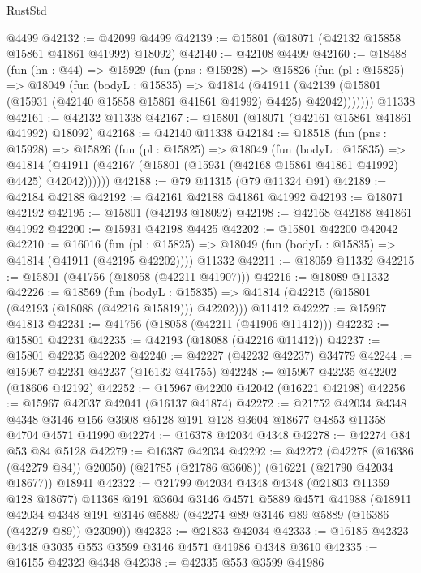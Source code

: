 \begin{lexlean}{RustStd}
\begin{coremodule}
    @4499
@42132 := @42099 @4499
@42139 := @15801 (@18071 (@42132 @15858 @15861 @41861 @41992) @18092)
@42140 := @42108 @4499
@42160 := @18488
    (fun (hn : @44) =>
    @15929
      (fun (pns : @15928) =>
      @15826
        (fun (pl : @15825) =>
        @18049
          (fun (bodyL : @15835) =>
          @41814
            (@41911
              (@42139 (@15801 (@15931 (@42140 @15858 @15861 @41861 @41992) @4425) @42042)))))))
    @11338
@42161 := @42132 @11338
@42167 := @15801 (@18071 (@42161 @15861 @41861 @41992) @18092)
@42168 := @42140 @11338
@42184 := @18518
    (fun (pns : @15928) =>
    @15826
      (fun (pl : @15825) =>
      @18049
        (fun (bodyL : @15835) =>
        @41814 (@41911 (@42167 (@15801 (@15931 (@42168 @15861 @41861 @41992) @4425) @42042))))))
@42188 := @79 @11315 (@79 @11324 @91)
@42189 := @42184 @42188
@42192 := @42161 @42188 @41861 @41992
@42193 := @18071 @42192
@42195 := @15801 (@42193 @18092)
@42198 := @42168 @42188 @41861 @41992
@42200 := @15931 @42198 @4425
@42202 := @15801 @42200 @42042
@42210 := @16016
    (fun (pl : @15825) => @18049 (fun (bodyL : @15835) => @41814 (@41911 (@42195 @42202))))
    @11332
@42211 := @18059 @11332
@42215 := @15801 (@41756 (@18058 (@42211 @41907)))
@42216 := @18089 @11332
@42226 := @18569
    (fun (bodyL : @15835) => @41814 (@42215 (@15801 (@42193 (@18088 (@42216 @15819))) @42202)))
    @11412
@42227 := @15967 @41813
@42231 := @41756 (@18058 (@42211 (@41906 @11412)))
@42232 := @15801 @42231
@42235 := @42193 (@18088 (@42216 @11412))
@42237 := @15801 @42235 @42202
@42240 := @42227 (@42232 @42237) @34779
@42244 := @15967 @42231 @42237 (@16132 @41755)
@42248 := @15967 @42235 @42202 (@18606 @42192)
@42252 := @15967 @42200 @42042 (@16221 @42198)
@42256 := @15967 @42037 @42041 (@16137 @41874)
@42272 := @21752
    @42034
    @4348
    @4348
    @3146
    @156
    @3608
    @5128
    @191
    @128
    @3604
    @18677
    @4853
    @11358
    @4704
    @4571
    @41990
@42274 := @16378 @42034 @4348
@42278 := @42274 @84 @53 @84 @5128
@42279 := @16387 @42034
@42292 := @42272
    (@42278 (@16386 (@42279 @84)) @20050)
    (@21785 (@21786 @3608))
    (@16221 (@21790 @42034 @18677))
    @18941
@42322 := @21799
    @42034
    @4348
    @4348
    (@21803 @11359 @128 @18677)
    @11368
    @191
    @3604
    @3146
    @4571
    @5889
    @4571
    @41988
    (@18911 @42034 @4348 @191 @3146 @5889 (@42274 @89 @3146 @89 @5889 (@16386 (@42279 @89)) @23090))
@42323 := @21833 @42034
@42333 := @16185 @42323 @4348 @3035 @553 @3599 @3146 @4571 @41986 @4348 @3610
@42335 := @16155 @42323 @4348
@42338 := @42335 @553 @3599 @41986

\end{coremodule}
\end{lexlean}
